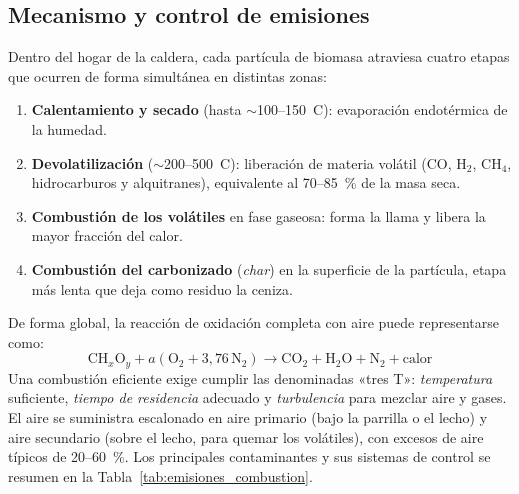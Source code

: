 \subsection{Mecanismo y control de emisiones}
Dentro del hogar de la caldera, cada partícula de biomasa atraviesa cuatro etapas que ocurren de forma simultánea en distintas zonas:
\begin{enumerate}[leftmargin=1.5em]
\item \textbf{Calentamiento y secado} (hasta $\sim$100--150~\textdegree C): evaporación endotérmica de la humedad.
\item \textbf{Devolatilización} ($\sim$200--500~\textdegree C): liberación de materia volátil ($\mathrm{CO}$, $\mathrm{H_2}$, $\mathrm{CH_4}$, hidrocarburos y alquitranes), equivalente al 70--85~\% de la masa seca.
\item \textbf{Combustión de los volátiles} en fase gaseosa: forma la llama y libera la mayor fracción del calor.
\item \textbf{Combustión del carbonizado} (\textit{char}) en la superficie de la partícula, etapa más lenta que deja como residuo la ceniza.
\end{enumerate}

De forma global, la reacción de oxidación completa con aire puede representarse como:
\begin{equation}
\mathrm{CH}_x\mathrm{O}_y + a\left(\mathrm{O_2} + 3{,}76\,\mathrm{N_2}\right) \longrightarrow \mathrm{CO_2} + \mathrm{H_2O} + \mathrm{N_2} + \text{calor}
\end{equation}
Una combustión eficiente exige cumplir las denominadas «tres T»: \textit{temperatura} suficiente, \textit{tiempo de residencia} adecuado y \textit{turbulencia} para mezclar aire y gases. El aire se suministra escalonado en aire primario (bajo la parrilla o el lecho) y aire secundario (sobre el lecho, para quemar los volátiles), con excesos de aire típicos de 20--60~\%. Los principales contaminantes y sus sistemas de control se resumen en la Tabla~\ref{tab:emisiones_combustion}.

